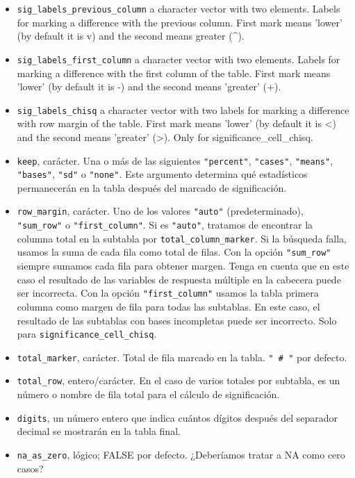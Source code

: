 \documentclass[
]{book}
\begin{document}
\begin{itemize}
\item
  \texttt{sig\_labels\_previous\_column} a character vector with two elements. Labels for marking a difference with the previous column. First mark means 'lower' (by default it is v) and the second means greater (\^{}).
\item
  \texttt{sig\_labels\_first\_column} a character vector with two elements. Labels for marking a difference with the first column of the table. First mark means 'lower' (by default it is -) and the second means 'greater' (+).
\item
  \texttt{sig\_labels\_chisq} a character vector with two labels for marking a difference with row margin of the table. First mark means 'lower' (by default it is \textless) and the second means 'greater' (\textgreater). Only for significance\_cell\_chisq.
\item
  \texttt{keep}, carácter. Una o más de las siguientes \texttt{"percent"}, \texttt{"cases"}, \texttt{"means"}, \texttt{"bases"}, \texttt{"sd"} o \texttt{"none"}. Este argumento determina qué estadísticos permanecerán en la tabla después del marcado de significación.
\item
  \texttt{row\_margin}, carácter. Uno de los valores \texttt{"auto"} (predeterminado), \texttt{"sum\_row"} o \texttt{"first\_column"}. Si es \texttt{"auto"}, tratamos de encontrar la columna total en la subtabla por \texttt{total\_column\_marker}. Si la búsqueda falla, usamos la suma de cada fila como total de filas. Con la opción \texttt{"sum\_row"} siempre sumamos cada fila para obtener margen. Tenga en cuenta que en este caso el resultado de las variables de respuesta múltiple en la cabecera puede ser incorrecta. Con la opción \texttt{"first\_column"} usamos la tabla primera columna como margen de fila para todas las subtablas. En este caso, el resultado de las subtablas con bases incompletas puede ser incorrecto. Solo para \texttt{significance\_cell\_chisq}.
\item
  \texttt{total\_marker}, carácter. Total de fila marcado en la tabla. \texttt{"\ \#\ "} por defecto.
\item
  \texttt{total\_row}, entero/carácter. En el caso de varios totales por subtabla, es un número o nombre de fila total para el cálculo de significación.
\item
  \texttt{digits}, un número entero que indica cuántos dígitos después del separador decimal se mostrarán en la tabla final.
\item
  \texttt{na\_as\_zero}, lógico; FALSE por defecto. ¿Deberíamos tratar a NA como cero casos?

\end{itemize}
\end{document}
